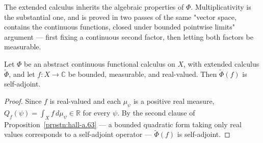 The extended calculus inherits the algebraic properties of $\Phi$. Multiplicativity is the substantial one, and is proved in two passes of the same "vector space, contains the continuous functions, closed under bounded pointwise limits" argument — first fixing a continuous second factor, then letting both factors be measurable.

\begin{lemma}
    \label{lmm:abstract-extended-real-self-adjoint}
    \leanok
    Let $\Phi$ be an abstract continuous functional calculus on $X$, with extended calculus $\widetilde\Phi$, and let $f : X \to \mathbb{C}$ be bounded, measurable, and real-valued. Then $\widetilde\Phi(f)$ is self-adjoint.
\end{lemma}
\begin{proof}
    \leanok
Since $f$ is real-valued and each $\mu_\psi$ is a positive real measure, $Q_f(\psi) = \int_X f\,d\mu_\psi \in \mathbb{R}$ for every $\psi$. By the second clause of Proposition~\ref{prpstn:hall-a.63} — a bounded quadratic form taking only real values corresponds to a self-adjoint operator — $\widetilde\Phi(f)$ is self-adjoint.
\end{proof}

